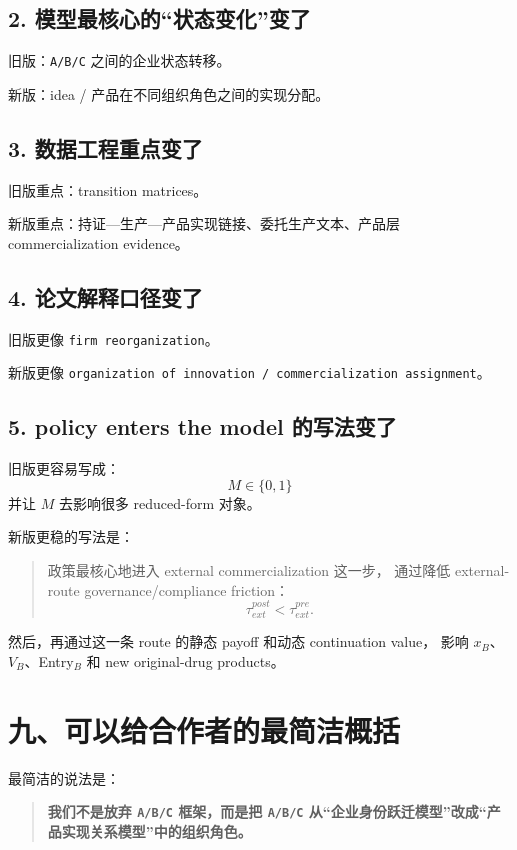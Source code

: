 \documentclass[12pt,fontset=none]{ctexart}
\begin{document}
\subsection*{2. 模型最核心的“状态变化”变了}

旧版：\texttt{A/B/C} 之间的企业状态转移。

新版：idea / 产品在不同组织角色之间的实现分配。

\subsection*{3. 数据工程重点变了}

旧版重点：transition matrices。

新版重点：持证—生产—产品实现链接、委托生产文本、产品层 commercialization evidence。

\subsection*{4. 论文解释口径变了}

旧版更像 \texttt{firm reorganization}。

新版更像 \texttt{organization of innovation / commercialization assignment}。

\subsection*{5. policy enters the model 的写法变了}

旧版更容易写成：
\[
M \in \{0,1\}
\]
并让 \(M\) 去影响很多 reduced-form 对象。

新版更稳的写法是：

\begin{quote}
政策最核心地进入 external commercialization 这一步，
通过降低 external-route governance/compliance friction：
\[
\tau_{ext}^{post}<\tau_{ext}^{pre}.
\]
\end{quote}

然后，再通过这一条 route 的静态 payoff 和动态 continuation value，
影响 \(x_B\)、\(V_B\)、Entry\(_B\) 和 new original-drug products。

\section{九、可以给合作者的最简洁概括}

最简洁的说法是：

\begin{quote}
\textbf{我们不是放弃 \texttt{A/B/C} 框架，而是把 \texttt{A/B/C}
从“企业身份跃迁模型”改成“产品实现关系模型”中的组织角色。}
\end{quote}
\end{document}
